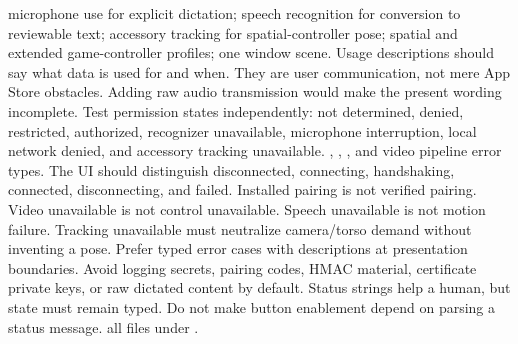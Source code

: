 \markdownRendererUlItem microphone use for explicit dictation;\markdownRendererUlItemEnd 
\markdownRendererUlItem speech recognition for conversion to reviewable text;\markdownRendererUlItemEnd 
\markdownRendererUlItem accessory tracking for spatial-controller pose;\markdownRendererUlItemEnd 
\markdownRendererUlItem spatial and extended game-controller profiles;\markdownRendererUlItemEnd 
\markdownRendererUlItem one window scene.\markdownRendererUlItemEnd 
\markdownRendererUlEnd \markdownRendererInterblockSeparator
{}Usage descriptions should say what data is used for and when. They are user communication, not mere App Store obstacles. Adding raw audio transmission would make the present wording incomplete.\markdownRendererParagraphSeparator
{}Test permission states independently: not determined, denied, restricted, authorized, recognizer unavailable, microphone interruption, local network denied, and accessory tracking unavailable.\markdownRendererInterblockSeparator
{}
\markdownRendererSectionEnd \markdownRendererSectionBegin
{}\markdownRendererInterblockSeparator
{}\markdownRendererBlockQuoteBegin
{} , , , and video pipeline error types.\markdownRendererBlockQuoteEnd \markdownRendererInterblockSeparator
{}The UI should distinguish disconnected, connecting, handshaking, connected, disconnecting, and failed. Installed pairing is not verified pairing. Video unavailable is not control unavailable. Speech unavailable is not motion failure. Tracking unavailable must neutralize camera/torso demand without inventing a pose.\markdownRendererParagraphSeparator
{}Prefer typed error cases with  descriptions at presentation boundaries. Avoid logging secrets, pairing codes, HMAC material, certificate private keys, or raw dictated content by default.\markdownRendererParagraphSeparator
{}Status strings help a human, but state must remain typed. Do not make button enablement depend on parsing a status message.\markdownRendererInterblockSeparator
{}
\markdownRendererSectionEnd \markdownRendererSectionBegin
{}\markdownRendererInterblockSeparator
{}\markdownRendererBlockQuoteBegin
{} all files under .\markdownRendererBlockQuoteEnd \markdownRendererInterblockSeparator
